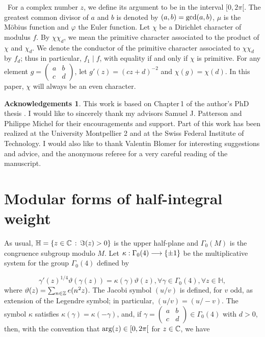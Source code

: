 \documentclass[leqno,10pt]{amsart}
\theoremstyle{plain}
\numberwithin{equation}{section}
\theoremstyle{definition}
\newtheorem*{ack}{Acknowledgements}
\theoremstyle{remark}
\begin{document}
 \
For a complex number $z$, we define its argument to be in the interval $[0,2\pi[$. The greatest common divisor of $a$ and $b$ is denoted by $(a,b)=\textnormal{gcd}(a,b)$, $\mu$ is the M\"obius function and $\varphi$ the Euler function. 
Let $\chi$ be a Dirichlet character of modulus $f$. By $\chi\chi_d$, we mean the primitive character associated to the product of $\chi$ and $\chi_d$. We denote the conductor of the primitive character associated to $\chi\chi_d$ by $f_d$; thus in particular, $f_1\mid f$, with equality if and only if $\chi$ is primitive. 
For any element  $g=\left(\begin{smallmatrix} a&b\\c&d \end{smallmatrix}\right)$, let $g'(z)=(cz+d)^{-2}$ and $\chi(g)=\chi(d)$. In this paper, $\chi$ will always be an even character.

\begin{ack}
This work is based on Chapter\,1 of the author's PhD thesis \cite{lou:these}. I would like to sincerely thank my advisors Samuel J. Patterson and Philippe Michel for their encouragements and support. Part of this work has been realized at the University Montpellier 2 and at the Swiss Federal Institute of Technology. I would also like to thank Valentin Blomer for interesting suggestions and advice, and the anonymous referee for a very careful reading of the manuscript.
\end{ack}

\section{Modular forms of half-integral weight}\label{sec:mod}

As usual, $\mathbb{H}=\{z\in\mathbb{C}\,:\, \Im(z)>0\}$ is the upper half-plane and $\Gamma_0(M)$ is the congruence subgroup modulo $M$. Let $\kappa:\Gamma_0(4)\longrightarrow \{\pm1\}$ be the multiplicative system for the group $\Gamma_0(4)$ defined by

\begin{equation}\label{mod:eq:1}
\gamma'(z)^{1/4} \vartheta(\gamma(z)) = \kappa(\gamma) \vartheta(z), \forall \gamma\in\Gamma_0(4), \forall z\in\mathbb{H},
\end{equation}
where $\vartheta(z) = \sum_{n\in\mathbb{Z}} e(n^2z)$. The Jacobi symbol $(u/v)$ is defined, for $v$ odd, as extension of the Legendre symbol; in particular, $(u/v)=(u/-v)$. The symbol $\kappa$ satisfies $\kappa(\gamma)=\kappa(-\gamma)$, and, if $\gamma=\left(\begin{smallmatrix} a&b\\c&d\end{smallmatrix}\right)\in\Gamma_0(4)$ with $d>0$, then, with the convention that $\textnormal{arg}(z)\in[0,2\pi[$ for $z\in \mathbb{C}$, we have
\end{document}

